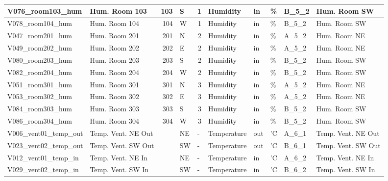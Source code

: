 \begin{landscape}
\begin{table}[htbp]
\begin{tabular}{|l|l|r|l|r|l|l|l|l|l|}
    \hline
    V076\_room103\_hum & Hum. Room 103  & 103  & S    & 1    & Humidity & in   & \%   & B\_5\_2 & Hum. Room SW \bigstrut\\
    \hline
    \rowcolor[rgb]{ .851,  .851,  .851} V078\_room104\_hum & Hum. Room 104  & 104  & W    & 1    & Humidity & in   & \%   & B\_5\_2 & Hum. Room SW \bigstrut\\
    \hline
    V047\_room201\_hum & Hum. Room 201 & 201  & N    & 2    & Humidity & in   & \%   & A\_5\_2 & Hum. Room NE \bigstrut\\
    \hline
    \rowcolor[rgb]{ .851,  .851,  .851} V049\_room202\_hum & Hum. Room 202 & 202  & E    & 2    & Humidity & in   & \%   & A\_5\_2 & Hum. Room NE \bigstrut\\
    \hline
    V080\_room203\_hum & Hum. Room 203 & 203  & S    & 2    & Humidity & in   & \%   & B\_5\_2 & Hum. Room SW \bigstrut\\
    \hline
    \rowcolor[rgb]{ .851,  .851,  .851} V082\_room204\_hum & Hum. Room 204 & 204  & W    & 2    & Humidity & in   & \%   & B\_5\_2 & Hum. Room SW \bigstrut\\
    \hline
    V051\_room301\_hum & Hum. Room 301 & 301  & N    & 3    & Humidity & in   & \%   & A\_5\_2 & Hum. Room NE \bigstrut\\
    \hline
    \rowcolor[rgb]{ .851,  .851,  .851} V053\_room302\_hum & Hum. Room 302 & 302  & E    & 3    & Humidity & in   & \%   & A\_5\_2 & Hum. Room NE \bigstrut\\
    \hline
    V084\_room303\_hum & Hum. Room 303 & 303  & S    & 3    & Humidity & in   & \%   & B\_5\_2 & Hum. Room SW \bigstrut\\
    \hline
    \rowcolor[rgb]{ .851,  .851,  .851} V086\_room304\_hum & Hum. Room 304 & 304  & W    & 3    & Humidity & in   & \%   & B\_5\_2 & Hum. Room SW \bigstrut\\
    \hline
    V006\_vent01\_temp\_out & Temp. Vent. NE Out &      & NE   & \multicolumn{1}{l|}{-} & Temperature & out  & 'C   & A\_6\_1 & Temp. Vent. NE Out \bigstrut\\
    \hline
    \rowcolor[rgb]{ .851,  .851,  .851} V023\_vent02\_temp\_out & Temp. Vent. SW Out &      & SW   & \multicolumn{1}{l|}{-} & Temperature & out  & 'C   & B\_6\_1 & Temp. Vent. SW Out \bigstrut\\
    \hline
    V012\_vent01\_temp\_in & Temp. Vent. NE In  &      & NE   & \multicolumn{1}{l|}{-} & Temperature & in   & 'C   & A\_6\_2 & Temp. Vent. NE In  \bigstrut\\
    \hline
    \rowcolor[rgb]{ .851,  .851,  .851} V029\_vent02\_temp\_in & Temp. Vent. SW In &      & SW   & \multicolumn{1}{l|}{-} & Temperature & in   & 'C   & B\_6\_2 & Temp. Vent. SW In \bigstrut\\

\end{tabular}
\end{table}
\end{landscape}
